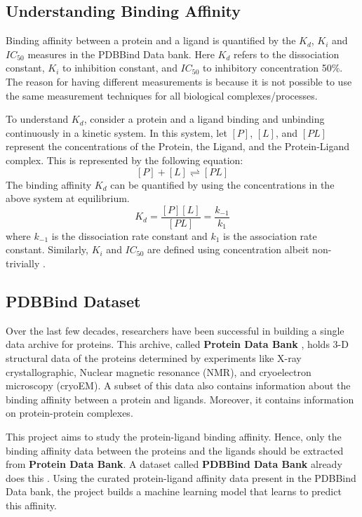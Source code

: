 \documentclass[11pt]{article}
\begin{document}
\subsection{Understanding Binding Affinity}
Binding affinity between a protein and a ligand is quantified by the $K_d$, $K_i$ and $IC_{50}$ measures in the PDBBind Data bank.
Here $K_d$ refers to the dissociation constant, $K_i$ to inhibition constant, and $IC_{50}$ to 
inhibitory concentration 50\%.
The reason for having different measurements is because it is not possible to use the same measurement techniques
for all biological complexes/processes.

To understand $K_d$, consider a protein and a ligand binding and unbinding continuously in a kinetic system.
In this system, let $[P]$, $[L]$, and $[PL]$ represent the concentrations of the Protein, the Ligand, and the Protein-Ligand complex.
This is represented by the following equation:
$$[P] + [L] \rightleftharpoons [PL]$$
The binding affinity $K_d$ can be quantified by using the concentrations in the above system at equilibrium.
$$K_d = \frac{[P][L]}{[PL]} = \frac{k_{-1}}{k_1}$$
where $k_{-1}$ is the dissociation rate constant and $k_1$ is the association rate constant.
Similarly, $K_i$ and $IC_{50}$ are defined using concentration albeit non-trivially
\cite{binding_affinity_description} \cite{proteinlingandbindingpaper}.

\subsection{PDBBind Dataset}
Over the last few decades, researchers have been successful in building a single data archive for proteins. This archive, called \textbf{Protein Data Bank} \cite{pdb_homepage}, holds 3-D structural data of the proteins determined by experiments like X-ray crystallographic, Nuclear magnetic resonance (NMR), and cryoelectron microscopy (cryoEM).  A subset of this data also contains information about the binding affinity between a protein and ligands. Moreover, it contains information on protein-protein complexes.
\cite{pdbank_history}

This project aims to study the protein-ligand binding affinity. Hence, only the binding affinity data between the proteins and the ligands should be extracted from \textbf{Protein Data Bank}.  A dataset called \textbf{PDBBind Data Bank} already does this
\cite{pdbbind_introduction}.
Using the curated protein-ligand affinity data present in the PDBBind Data bank, the project builds a machine learning model that learns to predict this affinity.
\end{document}
